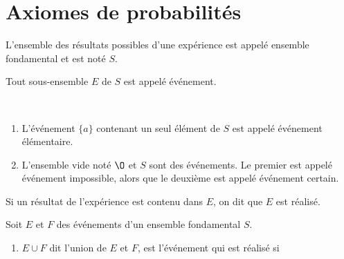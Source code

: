 \section[Chapitre 2]{Axiomes de probabilités}
	\begin{mydef}
		L'ensemble des résultats possibles d'une expérience est appelé ensemble fondamental et est noté $S$.
	\end{mydef}%
	\begin{mydef}[Événement]
		Tout sous-ensemble $E$ de $S$ est appelé événement.
		\begin{remark}~
			\begin{enumerate}
				\item L'événement $\{a\}$ contenant un seul élément de $S$ est appelé événement élémentaire.
				\item L'ensemble vide noté $\O$ et $S$ sont des événements. Le premier est appelé événement impossible, alors que le deuxième est appelé événement certain.
			\end{enumerate}%
		\end{remark}%
	\end{mydef}%
	\begin{mydef}
		Si un résultat de l'expérience est contenu dans $E$, on dit que $E$ est réalisé.
	\end{mydef}%
	\begin{mydef}
		Soit $E$ et $F$ des événements d'un ensemble fondamental $S$.
		\begin{enumerate}
			\item $E\cup F$ dit l'union de $E$ et $F$, est l'événement qui est réalisé si 
		\end{enumerate}
	\end{mydef}%